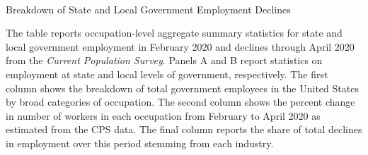 \begin{table} %
\begin{center}
\begin{threeparttable}

\caption{\\ Breakdown of State and Local Government Employment Declines}
\label{table:summary_occupation}

\centering 

\begin{small}

  

\end{small}

\begin{footnotesize}
\begin{tablenotes}
\item The table reports occupation-level aggregate summary statistics for state and local government employment in February 2020 and declines through April 2020 from the \emph{Current Population Survey}. Panels A and B report statistics on employment at state and local levels of government, respectively. The first column shows the breakdown of total government employees in the United States by broad categories of occupation. The second column shows the percent change in number of workers in each occupation from February to April 2020 as estimated from the CPS data. The final column reports the share of total declines in employment over this period stemming from each industry.    
\end{tablenotes}
\end{footnotesize}
\end{threeparttable}
\end{center}
\end{table}
\thispagestyle{empty}


